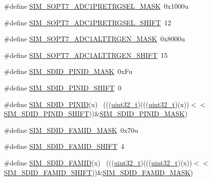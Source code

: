 \begin{DoxyCompactItemize}
\item 
\#define \hyperlink{group___s_i_m___register___masks_gad5a05f77e88118ff1b5c02e4a756f527}{S\+I\+M\+\_\+\+S\+O\+P\+T7\+\_\+\+A\+D\+C1\+P\+R\+E\+T\+R\+G\+S\+E\+L\+\_\+\+M\+A\+SK}~0x1000u
\item 
\#define \hyperlink{group___s_i_m___register___masks_ga8cf171203a65ae7c3842b32a90562558}{S\+I\+M\+\_\+\+S\+O\+P\+T7\+\_\+\+A\+D\+C1\+P\+R\+E\+T\+R\+G\+S\+E\+L\+\_\+\+S\+H\+I\+FT}~12
\item 
\#define \hyperlink{group___s_i_m___register___masks_ga784f68293064986f91f7a6221a67ed14}{S\+I\+M\+\_\+\+S\+O\+P\+T7\+\_\+\+A\+D\+C1\+A\+L\+T\+T\+R\+G\+E\+N\+\_\+\+M\+A\+SK}~0x8000u
\item 
\#define \hyperlink{group___s_i_m___register___masks_gab364156b2cb9b83329803bdc8c0c589e}{S\+I\+M\+\_\+\+S\+O\+P\+T7\+\_\+\+A\+D\+C1\+A\+L\+T\+T\+R\+G\+E\+N\+\_\+\+S\+H\+I\+FT}~15
\item 
\#define \hyperlink{group___s_i_m___register___masks_gaf0820acb74ce8270da2025fee624b47c}{S\+I\+M\+\_\+\+S\+D\+I\+D\+\_\+\+P\+I\+N\+I\+D\+\_\+\+M\+A\+SK}~0x\+Fu
\item 
\#define \hyperlink{group___s_i_m___register___masks_ga593faac0d0629fde52f6fe4b83614c23}{S\+I\+M\+\_\+\+S\+D\+I\+D\+\_\+\+P\+I\+N\+I\+D\+\_\+\+S\+H\+I\+FT}~0
\item 
\#define \hyperlink{group___s_i_m___register___masks_ga3ab62e28831b168141d554c707ac5c87}{S\+I\+M\+\_\+\+S\+D\+I\+D\+\_\+\+P\+I\+N\+ID}(x)                                            ~(((\hyperlink{_p_e___types_8h_a33594304e786b158f3fb30289278f5af}{uint32\+\_\+t})(((\hyperlink{_p_e___types_8h_a33594304e786b158f3fb30289278f5af}{uint32\+\_\+t})(x))$<$$<$\hyperlink{group___s_i_m___register___masks_ga593faac0d0629fde52f6fe4b83614c23}{S\+I\+M\+\_\+\+S\+D\+I\+D\+\_\+\+P\+I\+N\+I\+D\+\_\+\+S\+H\+I\+FT}))\&\hyperlink{group___s_i_m___register___masks_gaf0820acb74ce8270da2025fee624b47c}{S\+I\+M\+\_\+\+S\+D\+I\+D\+\_\+\+P\+I\+N\+I\+D\+\_\+\+M\+A\+SK})
\item 
\#define \hyperlink{group___s_i_m___register___masks_ga5344e7283b2aead14d9d3bded0114f3b}{S\+I\+M\+\_\+\+S\+D\+I\+D\+\_\+\+F\+A\+M\+I\+D\+\_\+\+M\+A\+SK}~0x70u
\item 
\#define \hyperlink{group___s_i_m___register___masks_ga377bc761e6ee1caab79baad3e2d0d331}{S\+I\+M\+\_\+\+S\+D\+I\+D\+\_\+\+F\+A\+M\+I\+D\+\_\+\+S\+H\+I\+FT}~4
\item 
\#define \hyperlink{group___s_i_m___register___masks_ga1c53c57d3312af915fc5419efec0b651}{S\+I\+M\+\_\+\+S\+D\+I\+D\+\_\+\+F\+A\+M\+ID}(x)                                            ~(((\hyperlink{_p_e___types_8h_a33594304e786b158f3fb30289278f5af}{uint32\+\_\+t})(((\hyperlink{_p_e___types_8h_a33594304e786b158f3fb30289278f5af}{uint32\+\_\+t})(x))$<$$<$\hyperlink{group___s_i_m___register___masks_ga377bc761e6ee1caab79baad3e2d0d331}{S\+I\+M\+\_\+\+S\+D\+I\+D\+\_\+\+F\+A\+M\+I\+D\+\_\+\+S\+H\+I\+FT}))\&\hyperlink{group___s_i_m___register___masks_ga5344e7283b2aead14d9d3bded0114f3b}{S\+I\+M\+\_\+\+S\+D\+I\+D\+\_\+\+F\+A\+M\+I\+D\+\_\+\+M\+A\+SK})

\end{DoxyCompactItemize}
